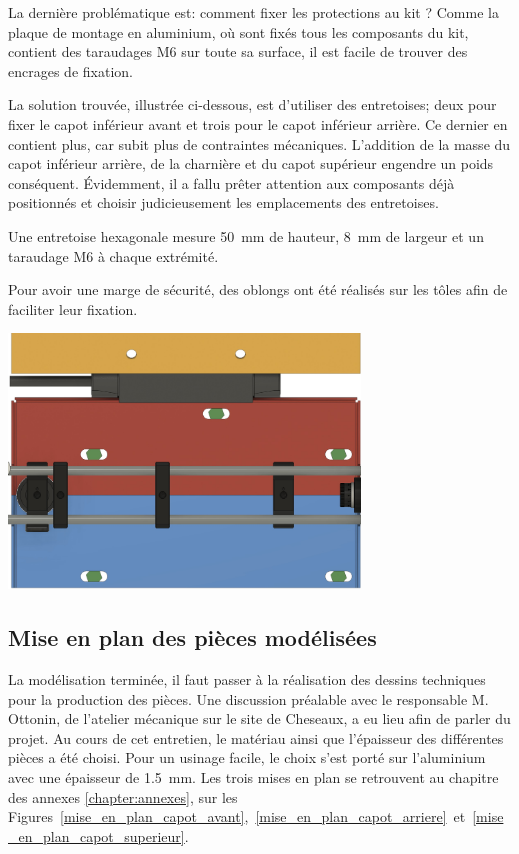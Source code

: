 \begin{minipage}{\textwidth}
    La dernière problématique est: comment fixer les protections au kit ? Comme la plaque de montage en aluminium, où sont fixés tous les composants du kit, contient des taraudages M6 sur toute sa surface, il est facile de trouver des encrages de fixation.

    La solution trouvée, illustrée ci-dessous, est d'utiliser des entretoises; deux pour fixer le capot inférieur avant et trois pour le capot inférieur arrière. Ce dernier en contient plus, car subit plus de contraintes mécaniques. L'addition de la masse du capot inférieur arrière, de la charnière et du capot supérieur engendre un poids conséquent. Évidemment, il a fallu prêter attention aux composants déjà positionnés et choisir judicieusement les emplacements des entretoises.

    Une entretoise hexagonale mesure 50~mm de hauteur, 8~mm de largeur et un taraudage M6 à chaque extrémité.

    Pour avoir une marge de sécurité, des oblongs ont été réalisés sur les tôles afin de faciliter leur fixation.
    \vspace{1em}
    \begin{center}
        \includegraphics[width=0.7\textwidth]{assets/figures/Protections_laser/Securite_mecanique/Protection_entree_laser/contrainte_entretoises.jpeg}
    \end{center}
    \label{contrainte_entretoises}
\end{minipage}

\subsection{Mise en plan des pièces modélisées}
La modélisation terminée, il faut passer à la réalisation des dessins techniques pour la production des pièces. Une discussion préalable avec le responsable M. Ottonin, de l'atelier mécanique sur le site de Cheseaux, a eu lieu afin de parler du projet. Au cours de cet entretien, le matériau ainsi que l'épaisseur des différentes pièces a été choisi. Pour un usinage facile, le choix s'est porté sur l'aluminium avec une épaisseur de 1.5~mm. Les trois mises en plan se retrouvent au chapitre des annexes \ref{chapter:annexes}, sur les Figures~\ref{mise_en_plan_capot_avant},~\ref{mise_en_plan_capot_arriere}~et~\ref{mise_en_plan_capot_superieur}.

